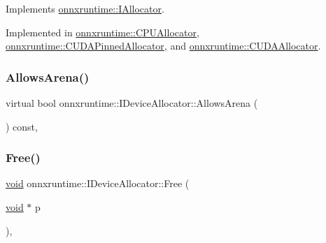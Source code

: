 Implements \mbox{\hyperlink{classonnxruntime_1_1IAllocator_a765590df724d3e7805c1dddbfe290b11}{onnxruntime\+::\+I\+Allocator}}.



Implemented in \mbox{\hyperlink{classonnxruntime_1_1CPUAllocator_a682cac57e48712c5c09506c21d92905c}{onnxruntime\+::\+C\+P\+U\+Allocator}}, \mbox{\hyperlink{classonnxruntime_1_1CUDAPinnedAllocator_a22d04b010dc7782d37689ae50bab2535}{onnxruntime\+::\+C\+U\+D\+A\+Pinned\+Allocator}}, and \mbox{\hyperlink{classonnxruntime_1_1CUDAAllocator_a21b66ae0d3ddcfdfd6c2bcafcffcdfda}{onnxruntime\+::\+C\+U\+D\+A\+Allocator}}.

\mbox{\label{classonnxruntime_1_1IDeviceAllocator_aac1ebfa9311d21dbfad28d36c568e0b3}} 
\subsubsection{\texorpdfstring{Allows\+Arena()}{AllowsArena()}}
{\footnotesize\ttfamily virtual bool onnxruntime\+::\+I\+Device\+Allocator\+::\+Allows\+Arena (\begin{DoxyParamCaption}{ }\end{DoxyParamCaption}) const\hspace{0.3cm}{\ttfamily [inline]}, {\ttfamily [virtual]}}

\mbox{\label{classonnxruntime_1_1IDeviceAllocator_aeabef1862123ae6d9478199db974e32a}} 
\subsubsection{\texorpdfstring{Free()}{Free()}}
{\footnotesize\ttfamily \mbox{\hyperlink{mlasi_8h_a88f941d423cb2a819b70a1358982b1a6}{void}} onnxruntime\+::\+I\+Device\+Allocator\+::\+Free (\begin{DoxyParamCaption}\item[{\mbox{\hyperlink{mlasi_8h_a88f941d423cb2a819b70a1358982b1a6}{void}} $\ast$}]{p }\end{DoxyParamCaption})\hspace{0.3cm}{\ttfamily [override]}, {}}



